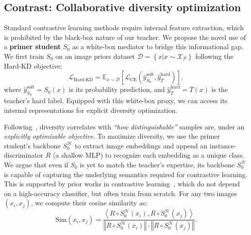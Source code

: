 \subsection{Contrast: Collaborative diversity optimization} \label{ch4:ssec:03-framework-contrast}
\begin{foldable} %
    Standard contrastive learning methods require internal feature extraction, which is prohibited by the black-box nature of our teacher.
    We propose the novel use of a \textbf{primer student} $S_{0}$ as a white-box mediator to bridge this informational gap.
    We first train $S_{0}$ on an image priors dataset $\mathcal{D} = \left\{ x | x \sim \mathcal{X}_{\mathcal{P}} \right\}$ following the Hard-KD objective:
    \begin{equation} \label{ch4:eq:loss-hard-kd}
        \mathcal{L}_{\text{Hard-KD}}=\mathbb{E}_{x\sim\mathcal{D}}\left[\mathcal{L}_{\text{CE}}\left(\hat{y}_{S_0}^\text{soft},\hat{y}_{T}^\text{hard}\right)\right],
    \end{equation}
    where $\hat{y}_{S_0}^\text{soft} = S_0(x)$ is its probability prediction, and $\hat{y}_{T}^\text{hard}=T\left(x\right)$ is the teacher's hard label.
    Equipped with this white-box proxy, we can access its internal representations for explicit diversity optimization.
\end{foldable}

\begin{foldable} %
    Following~\cite{fang2021contrastive}, diversity correlates with \textit{``how distinguishable''} samples are, under an \textit{explicitly optimizable objective}.
    To maximize diversity, we use the primer student's backbone $S_{0}^{\mathcal{H}}$ to extract image embeddings and append an instance-discriminator $R$ (a shallow MLP) to recognize each embedding as a unique class.
    We argue that even if $S_0$ is yet to match the teacher's expertise, its backbone $S_{0}^{\mathcal{H}}$ is capable of capturing the underlying semantics required for contrastive learning.
    This is supported by prior works in contrastive learning~\cite{chen2020simple,he2020momentum,zbontar2021barlow}, which do not depend on a high-accuracy classifier, but often train from scratch.
    For any two images $(x_i, x_j)$, we compute their cosine similarity as:
    \begin{equation}
        \text{Sim}\left(x_i, x_j\right)=
            \frac{ \left\langle R \circ S_{0}^{\mathcal{H}}\left(x_i\right), R \circ S_{0}^{\mathcal{H}}\left(x_j\right)\right\rangle }
            { \left\Vert R \circ S_{0}^{\mathcal{H}}\left(x_i\right) \right\Vert \cdot\left\Vert R \circ S_{0}^{\mathcal{H}}\left(x_j\right) \right\Vert }.
    \end{equation}
\end{foldable}

